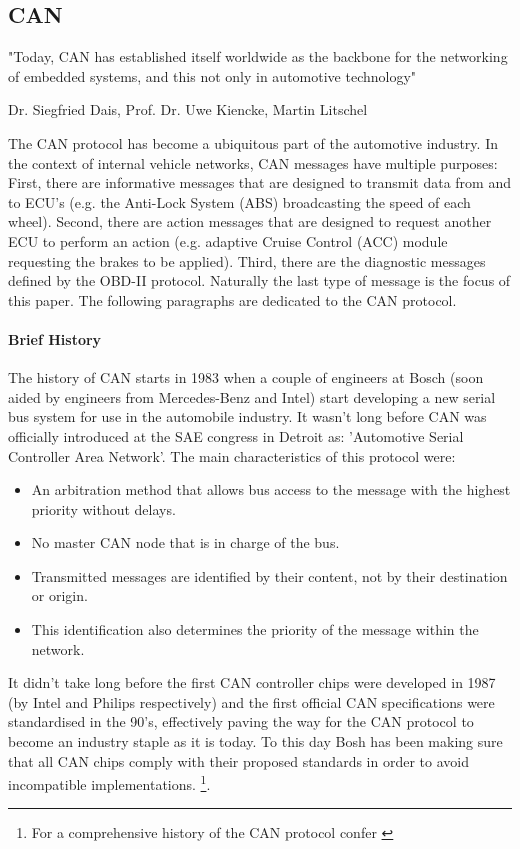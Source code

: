 \documentclass[master=cws,masteroption=vs,english]{kulemt}
\begin{document}
\subsection{CAN}
\label{sec:can}


\epigraph{"Today, CAN has established itself worldwide as the backbone for the networking of embedded systems, and this not only in automotive technology"}{Dr. Siegfried Dais, Prof. Dr. Uwe Kiencke, Martin Litschel}


The CAN protocol has become a ubiquitous part of the automotive industry. In the context of internal vehicle networks, CAN messages have multiple purposes: First, there are informative messages that are designed to transmit data from and to ECU's (e.g. the Anti-Lock System (ABS) broadcasting the speed of each wheel). Second, there are action messages that are designed to request another ECU to perform an action (e.g. adaptive Cruise Control (ACC) module requesting the brakes to be applied). Third, there are the diagnostic messages defined by the OBD-II protocol. \cite{MillerB} Naturally the last type of message is the focus of this paper. The following paragraphs are dedicated to the CAN protocol.

\paragraph{Brief History} 

The history of CAN starts in 1983 when a couple of engineers at Bosch (soon aided by engineers from Mercedes-Benz and Intel) start developing a new serial bus system for use in the automobile industry. It wasn't long before CAN was officially introduced at the SAE congress in Detroit as: 'Automotive Serial Controller Area Network'. The main characteristics of this protocol were: 

\begin{itemize}
	\item An arbitration method that allows bus access to the message with the highest priority without delays.
	\item No master CAN node that is in charge of the bus.
	\item Transmitted messages are identified by their content, not by their destination or origin.
	\item This identification also determines the priority of the message within the network.
\end{itemize}

It didn't take long before the first CAN controller chips were developed in 1987 (by Intel and Philips respectively) and the first official CAN specifications were standardised in the 90's, effectively paving the way for the CAN protocol to become an industry staple as it is today. To this day Bosh has been making sure that all CAN chips comply with their proposed standards in order to avoid incompatible implementations. \footnote{For a comprehensive history of the CAN protocol confer \cite{CANhistory}}.
\end{document}
